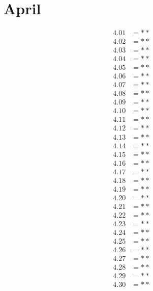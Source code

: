 \documentclass[12pt]{article}
\begin{document}
\section{April}
\begin{align*}
4.01 &= **\\
4.02 &= **\\
4.03 &= **\\
4.04 &= **\\
4.05 &= **\\
4.06 &= **\\
4.07 &= **\\
4.08 &= **\\
4.09 &= **\\
4.10 &= **\\
4.11 &= **\\
4.12 &= **\\
4.13 &= **\\
4.14 &= **\\
4.15 &= **\\
4.16 &= **\\
4.17 &= **\\
4.18 &= **\\
4.19 &= **\\
4.20 &= **\\
4.21 &= **\\
4.22 &= **\\
4.23 &= **\\
4.24 &= **\\
4.25 &= **\\
4.26 &= **\\
4.27 &= **\\
4.28 &= **\\
4.29 &= **\\
4.30 &= **\\
\end{align*}

\pagebreak
\end{document}
